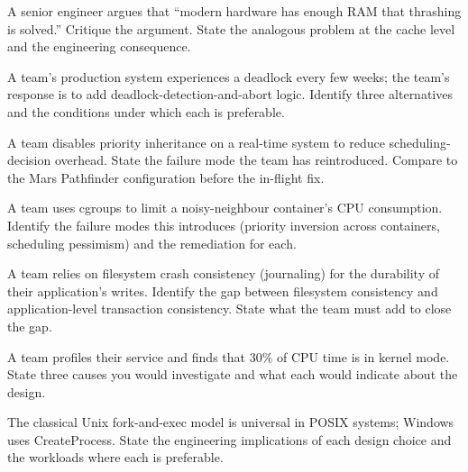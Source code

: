 \begin{exercise}
A senior engineer argues that ``modern hardware has enough RAM that thrashing is solved.'' Critique the argument. State the analogous problem at the cache level and the engineering consequence.
\end{exercise}

\begin{exercise}
A team's production system experiences a deadlock every few weeks; the team's response is to add deadlock-detection-and-abort logic. Identify three alternatives and the conditions under which each is preferable.
\end{exercise}

\begin{exercise}
A team disables priority inheritance on a real-time system to reduce scheduling-decision overhead. State the failure mode the team has reintroduced. Compare to the Mars Pathfinder configuration before the in-flight fix.
\end{exercise}

\begin{exercise}
A team uses cgroups to limit a noisy-neighbour container's CPU consumption. Identify the failure modes this introduces (priority inversion across containers, scheduling pessimism) and the remediation for each.
\end{exercise}

\begin{exercise}
A team relies on filesystem crash consistency (journaling) for the durability of their application's writes. Identify the gap between filesystem consistency and application-level transaction consistency. State what the team must add to close the gap.
\end{exercise}

\begin{exercise}
A team profiles their service and finds that $30\%$ of CPU time is in kernel mode. State three causes you would investigate and what each would indicate about the design.
\end{exercise}

\begin{exercise}
The classical Unix fork-and-exec model is universal in POSIX systems; Windows uses CreateProcess. State the engineering implications of each design choice and the workloads where each is preferable.
\end{exercise}

